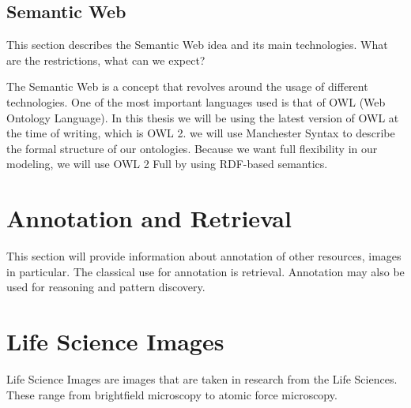 
\subsection{Semantic Web}

This section describes the Semantic Web idea and
its main technologies. What are the restrictions, what can we expect?

The Semantic Web is a concept that revolves around the usage of
different technologies. One of the most important languages used is
that of OWL (Web Ontology Language). In this thesis we will
be using the latest version of OWL at the time of writing, which is
OWL 2. we will use Manchester Syntax to
describe the formal structure of our
ontologies. Because we want full flexibility in our
modeling, we will use OWL 2 Full by using RDF-based
semantics.




\section{Annotation and Retrieval}

This section will provide information about
annotation of other resources, images in
particular. The classical use for annotation is
retrieval. Annotation may also be used for
reasoning and pattern discovery.


\section{Life Science Images}

Life Science Images are images that are
taken in research from the Life Sciences. These range from brightfield
microscopy to atomic force
microscopy.

